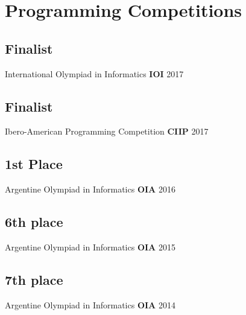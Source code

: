 \section{Programming Competiti\textcolor{mycolor}{ons}}
  \subsection{Finalist}
    International Olympiad in Informatics {\bfseries\textcolor{mycolor}{IOI}}
    {\textcolor{mygrey}{\hspace*{\fill}2017}}
  \subsection{Finalist}
    Ibero-American Programming Competition {\bfseries\textcolor{mycolor}{CIIP}}
    {\textcolor{mygrey}{\hspace*{\fill}2017}}
  \subsection{1st Place}
    Argentine Olympiad in Informatics {\bfseries\textcolor{mycolor}{OIA} }
    {\textcolor{mygrey}{\hspace*{\fill}2016}}
  \subsection{6th place}
    Argentine Olympiad in Informatics {\bfseries\textcolor{mycolor}{OIA}}
    {\textcolor{mygrey}{\hspace*{\fill}2015}}
  \subsection{7th place}
    Argentine Olympiad in Informatics {\bfseries\textcolor{mycolor}{OIA}}
    {\textcolor{mygrey}{\hspace*{\fill}2014}}
